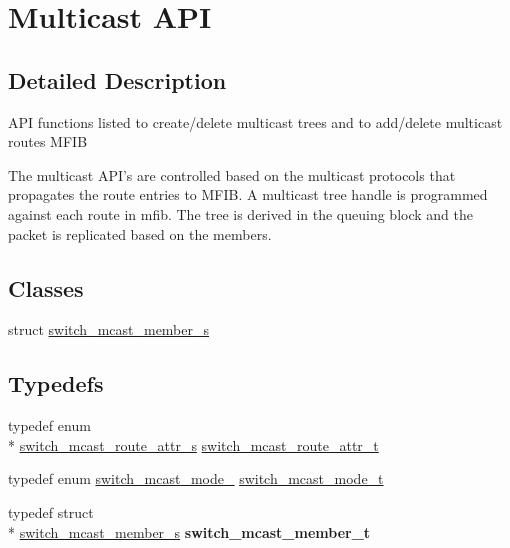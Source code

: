 \hypertarget{group__MULTICAST}{\section{Multicast A\+P\+I}
\label{group__MULTICAST}
}


\subsection{Detailed Description}
A\+P\+I functions listed to create/delete multicast trees and to add/delete multicast routes M\+F\+I\+B

The multicast A\+P\+I's are controlled based on the multicast protocols that propagates the route entries to M\+F\+I\+B. A multicast tree handle is programmed against each route in mfib. The tree is derived in the queuing block and the packet is replicated based on the members. \subsection*{Classes}
\begin{DoxyCompactItemize}
\item 
struct \hyperlink{structswitch__mcast__member__s}{switch\+\_\+mcast\+\_\+member\+\_\+s}
\end{DoxyCompactItemize}
\subsection*{Typedefs}
\begin{DoxyCompactItemize}
\item 
typedef enum \\*
\hyperlink{group__MULTICAST_gac149f82b4265da38bcb13f6745749e2e}{switch\+\_\+mcast\+\_\+route\+\_\+attr\+\_\+s} \hyperlink{group__MULTICAST_ga2312dc87779fff0cad006e54ae20bae4}{switch\+\_\+mcast\+\_\+route\+\_\+attr\+\_\+t}
\item 
typedef enum \hyperlink{group__MULTICAST_gae6d9578ab942865212c38f150d50cdf8}{switch\+\_\+mcast\+\_\+mode\+\_\+} \hyperlink{group__MULTICAST_ga4559597730b0814511eb5ae86dd2bf31}{switch\+\_\+mcast\+\_\+mode\+\_\+t}
\item 
\hypertarget{group__MULTICAST_gaf6a5b6b32ceb9e89af190b39cb5a9076}{typedef struct \\*
\hyperlink{structswitch__mcast__member__s}{switch\+\_\+mcast\+\_\+member\+\_\+s} {\bfseries switch\+\_\+mcast\+\_\+member\+\_\+t}}\label{group__MULTICAST_gaf6a5b6b32ceb9e89af190b39cb5a9076}

\end{DoxyCompactItemize}
